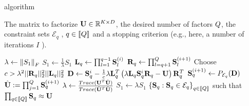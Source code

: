 \begin{algorithm}
	\caption{\palm algorithm}
	\label{algo:palm4msa}
	\begin{algorithmic}[1]
		
		\REQUIRE The matrix to factorize ${\mathbf{U}} \in \mathbb{R}^{K \times D}$, the desired number of factors $Q$, the constraint sets $\mathcal{E}_q$ , $q\in \left \llbracket Q\right \rrbracket$ and a stopping criterion (e.g., here, a number of iterations $I$ ).
		
		\STATE $\lambda \leftarrow \left \| S_1\right \|_F$
		\label{line:palm:init:lambda}
		\STATE $S_1 \leftarrow \frac{1}{\lambda} S_1$
		\label{line:palm:normalize:S1}
		\STATE  ${\mathbf{L}}_q \leftarrow \prod_{l=1}^{q-1} {\mathbf{S}}_{l}^{(i)}$
		\label{line:palm:L}
		\STATE  ${\mathbf{R}}_q \leftarrow \prod_{l=q+1}^{Q} {\mathbf{S}}_{l}^{(i+1)}$
		\label{line:palm:R}
		\STATE Choose $c > \lambda^2 ||{\mathbf{R}}_q||_2^2 ||{\mathbf{L}}_q||_2^2$
		\label{line:palm:c}
		\STATE ${\mathbf{D}} \leftarrow {\mathbf{S}}_q^i - \frac{1}{c} \lambda {\mathbf{L}}_q^T\left (\lambda{\mathbf{L}}_q {\mathbf{S}}_q^i {\mathbf{R}}_q - {\mathbf{U}}\right ){\mathbf{R}}_q^T$
		\label{line:palm:D}
		\STATE ${\mathbf{S}}^{(i+1)}_q \leftarrow P_{\mathcal{E}_q}({\mathbf{D}})$
		\label{line:palm:update:S}
		\ENDFOR
		\STATE $\hat {{\mathbf{U}}} := \prod_{j=1}^{Q} {\mathbf{S}}_q^{(i+1)}$
		\label{line:palm:U}
		\STATE $\lambda \leftarrow \frac{Trace({\mathbf{U}}^T\hat{{\mathbf{U}}})}{Trace(\hat{{\mathbf{U}}}^T\hat{{\mathbf{U}}})}$%
		\label{line:palm:update:lambda}
		\ENDFOR
		\STATE $S_1 \leftarrow \lambda S_1$
		\label{line:palm:postprocess:S1}
		\ENSURE $\left \lbrace {\mathbf{S}}_q : {\mathbf{S}}_q \in \mathcal{E}_q\right \rbrace_{q\in\left \llbracket Q\right \rrbracket}$ such that $\prod_{q\in\left \llbracket Q\right \rrbracket}{\mathbf{S}}_q \approx {\mathbf{U}}$
		
	\end{algorithmic}
\end{algorithm}

